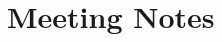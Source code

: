 \documentclass[]{weekly-report}
\begin{document}
\section{Meeting Notes}



{}



\label{last_page}

 
\end{document}
